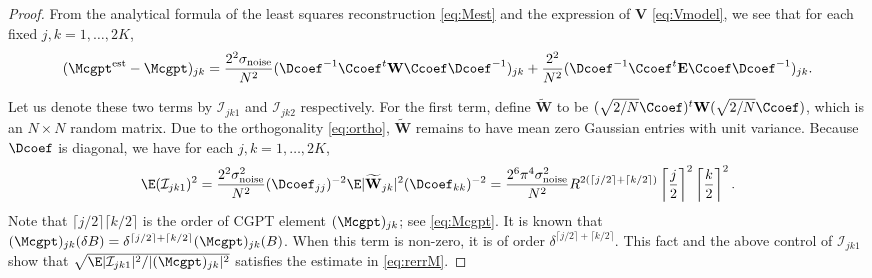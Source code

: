 \begin{proof}
From the analytical formula of the least squares reconstruction
\eqref{eq:Mest} and the expression of $\mathbf{V}$
\eqref{eq:Vmodel}, we see that
for each fixed $j,k = 1, \ldots, 2K$,
\begin{equation*}
(\Mcgpt^{\mathrm{est}} - \Mcgpt)_{jk} =  \frac{2^2
\sigma_{\mathrm{noise}}}{N^2} (\Dcoef^{-1} \Ccoef^t \mathbf{W}
\Ccoef \Dcoef^{-1})_{jk} + \frac{2^2}{N^2}(\Dcoef^{-1} \Ccoef^t
\mathbf{E} \Ccoef \Dcoef^{-1})_{jk}.
\end{equation*}

Let us denote these two terms by $\mathcal{I}_{jk1}$ and
$\mathcal{I}_{jk2}$ respectively. For the first term, define
$\widetilde{\mathbf{W}}$ to be $(\sqrt{2/N}\Ccoef)^t \mathbf{W}
(\sqrt{2/N}\Ccoef)$, which is an $N \times N$ random matrix. Due
to the orthogonality \eqref{eq:ortho}, $\widetilde{\mathbf{W}}$
remains to have mean zero Gaussian entries with unit variance.
Because $\Dcoef$ is diagonal, we have for each $j,k = 1, \ldots,
2K$,
\begin{equation*}
\E (\mathcal{I}_{jk1})^2 =
\frac{2^2\sigma^2_{\mathrm{noise}}}{N^2} (\Dcoef_{jj})^{-2} \E
|\widetilde{\mathbf{W}}_{jk}|^2 (\Dcoef_{kk})^{-2} =
\frac{2^6\pi^4 \sigma^2_{\mathrm{noise}}}{N^2} R^{2(\lceil j/2
\rceil + \lceil k/2 \rceil)} \left\lceil \frac{j}{2} \right
\rceil^2 \left\lceil \frac{k}{2} \right\rceil^2.
\end{equation*}
Note that $\lceil j/2 \rceil \lceil k/2 \rceil$ is the order of
CGPT element $(\Mcgpt)_{jk}$; see \eqref{eq:Mcgpt}. It is known
that $(\Mcgpt)_{jk}(\delta B) = \delta^{\lceil j/2 \rceil + \lceil
k/2 \rceil} (\Mcgpt)_{jk}(B)$. When this term is non-zero, it is
of order $\delta^{\lceil j/2 \rceil + \lceil k/2 \rceil}$. This
fact and the above control of $\mathcal{I}_{jk1}$ show that
$\sqrt{\E |\mathcal{I}_{jk1}|^2/|(\Mcgpt)_{jk}|^2}$ satisfies the
estimate in \eqref{eq:rerrM}.


\end{proof}
